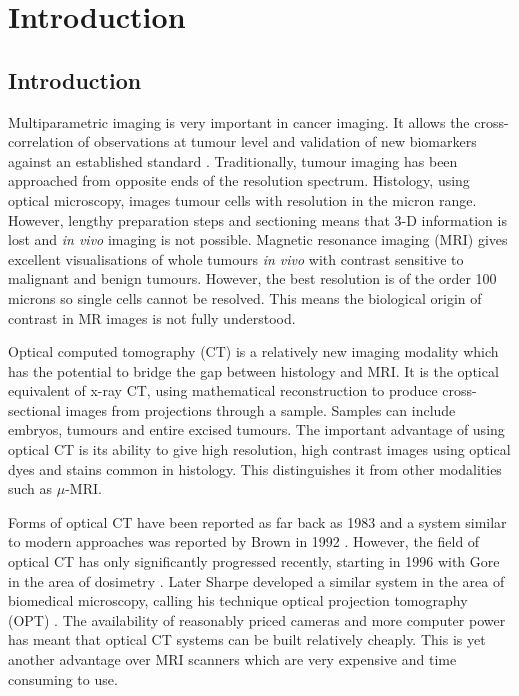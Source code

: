 \chapter{Introduction}

	\section{Introduction}
	\label{sec:intro}
	
	Multiparametric imaging is very important in cancer imaging. It allows the cross-correlation of observations at tumour level and  validation of new biomarkers against an established standard \cite{Padhani:2010hfa}. 
	Traditionally, tumour imaging has been approached from opposite ends of the resolution spectrum. Histology, using optical microscopy,  images tumour cells with resolution in the micron range. However, lengthy preparation steps and sectioning means that 3-D information is lost and \textit{in vivo} imaging is not possible. Magnetic resonance imaging (MRI) gives excellent visualisations of whole tumours \textit{in vivo} with contrast sensitive to malignant and benign tumours. However, the best resolution is of the order 100 microns so single cells cannot be resolved. This means the biological origin of contrast in MR images is not fully understood. 
	
	Optical computed tomography (CT) is a relatively new imaging modality which has the potential to bridge the gap between histology and MRI. It is the optical equivalent of x-ray CT, using mathematical reconstruction to produce cross-sectional images from projections through a sample. Samples can include embryos, tumours and entire excised tumours. The important advantage of using optical CT is its ability to give high resolution, high contrast images using optical dyes and stains common in histology. This distinguishes it from other modalities such as $\mu$-MRI.
	
	Forms of optical CT have been reported as far back as 1983 \cite{ray1983laser,kawata1990laser} %
	and a system similar to modern approaches was reported by Brown in 1992 \cite{Brown:1992}. 
	However, the field of optical CT has only significantly  progressed recently, starting in 1996 with Gore in the area of dosimetry  \cite{Gore:1999tg}. Later Sharpe developed a similar system in the area of biomedical microscopy, calling his technique optical projection tomography (OPT)  \cite{Sharpe:2002jp}. The availability of reasonably priced cameras and more computer power has meant that optical CT systems can be built relatively cheaply. This is yet another advantage over MRI scanners which are very expensive and time consuming to use.
	
